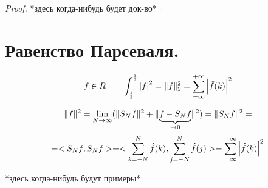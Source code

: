 \documentclass[matan]{subfiles}
\begin{document}
  \begin{proof}
    *здесь когда-нибудь будет док-во*
  \end{proof}

  \newpage
  \section{Равенство Парсеваля.}
  \hypertarget{q60}{}
  \begin{consequence}
    \[f \in R \qq \int_{\frac{1}{2}}^{\frac{1}{2}} \abs{f}^2 = \Abs{f}^2_2 = \sum_{-\infty}^{+\infty} \abs{\hat{f}(k)}^2\]
  \end{consequence}

  \begin{Proof}
    \[\Abs{f}^2 = \lim_{N \ra \infty}(\Abs{S_N f}^2 + \Abs{\ub{\ra 0}{f - S_N f}}^2) = \Abs{S_N f}^2 =\]
    \[= <S_N f, S_N f> = <\sum_{k=-N}^{N} \hat{f}(k), \sum_{j=-N}^{N} \hat{f}(j)> = \sum_{-\infty}^{+\infty} \abs{\hat{f}(k)}^2\]
  \end{Proof}

  \begin{examples}
    *здесь когда-нибудь будут примеры*
  \end{examples}
\end{document}
